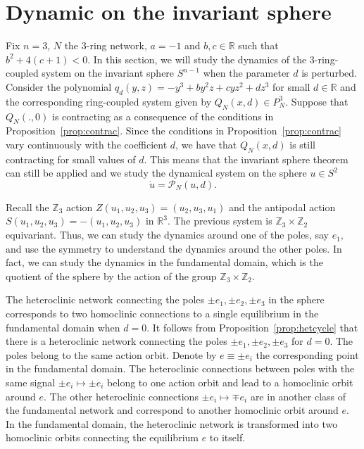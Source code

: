 \documentclass{article}
\theoremstyle{definition}
\begin{document}
\section{Dynamic on the invariant sphere}\label{sec:perturb}

Fix $n=3$, $N$ the $3$-ring network, $a=-1$ and $b,c\in\mathbb{R}$ such that $b^2+4(c+1)<0$. 
In this section, we will study the dynamics of the $3$-ring-coupled system on the invariant sphere $S^{n-1}$ when the parameter $d$ is perturbed.
Consider the polynomial $q_d(y,z)=-y^3+b y^2 z + c y z^2+d z^3$ for small $d\in\mathbb{R}$ and the corresponding ring-coupled system given by $Q_N(x,d)\in P_N^3$.
Suppose that $Q_N(.,0)$ is contracting as a consequence of the conditions in Proposition~\ref{prop:contrac}.
Since the conditions in Proposition~\ref{prop:contrac} vary continuously with the coefficient $d$, we have that $Q_N(x,d)$ is still contracting for small values of $d$.
This means that the invariant sphere theorem can still be applied and we study the dynamical system on the sphere $u\in S^{2}$
$$\dot{u}=\mathcal{P}_N(u,d).$$

Recall the $\mathbb{Z}_3$ action $Z(u_1,u_2,u_3)=(u_2,u_3,u_1)$ and the antipodal action $S(u_1,u_2,u_3)=-(u_1,u_2,u_3)$ in $\mathbb{R}^3$.
The previous system is $\mathbb{Z}_3\times \mathbb{Z}_2$ equivariant.
Thus, we can study the dynamics around one of the poles, say $e_1$, and use the symmetry to understand the dynamics around the other poles.
In fact, we can study the dynamics in the fundamental domain, which is the quotient of the sphere by the action of the group $\mathbb{Z}_3\times \mathbb{Z}_2$.


The heteroclinic network connecting the poles $\pm e_1,\pm e_2,\pm e_3$ in the sphere corresponds to two homoclinic connections to a single equilibrium in the fundamental domain when $d=0$.
It follows from Proposition~\ref{prop:hetcycle} that there is a heteroclinic network connecting the poles $\pm e_1,\pm e_2,\pm e_3$ for $d=0$.
The poles belong to the same action orbit.
Denote by $e\equiv \pm e_i $ the corresponding point in the fundamental domain.
The heteroclinic connections between poles with the same signal $\pm e_i \mapsto \pm e_i$ belong to one action orbit and lead to a homoclinic orbit around $e$.
The other heteroclinic connections $\pm e_i \mapsto \mp e_i$ are in another class of the fundamental network and correspond to another homoclinic orbit around $e$.
In the fundamental domain, the heteroclinic network is transformed into two homoclinic orbits connecting the equilibrium $e$ to itself.
\end{document}
